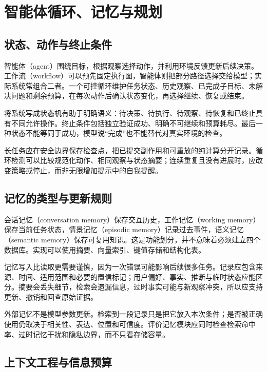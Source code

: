 \setcounter{chapter}{16} %
\chapter{智能体循环、记忆与规划}
\label{ch:agents}

\section{状态、动作与终止条件}

智能体（agent）围绕目标，根据观察选择动作，并利用环境反馈更新后续决策。工作流（workflow）可以预先固定执行图，智能体则把部分路径选择交给模型；实际系统常组合二者。一个可控循环维护任务状态、历史观察、已完成子目标、未解决问题和剩余预算，在每次动作后确认状态变化，再选择继续、恢复或结束。

将系统写成状态机有助于明确语义：待决策、待执行、待观察、待恢复和已终止具有不同允许操作。终止条件包括独立验证成功、明确不可继续和预算耗尽。最后一种状态不能等同于成功，模型说“完成”也不能替代对真实环境的检查。

长任务应在安全边界保存检查点，把已提交副作用和可重放的纯计算分开记录。循环检测可以比较规范化动作、相同观察与状态摘要；连续重复且没有进展时，应改变策略或停止，而非无限增加提示中的自我提醒。

\section{记忆的类型与更新规则}

会话记忆（conversation memory）保存交互历史，工作记忆（working memory）保存当前任务状态，情景记忆（episodic memory）记录过去事件，语义记忆（semantic memory）保存可复用知识。这是功能划分，并不意味着必须建立四个数据库。实现可以使用摘要、向量索引、键值存储和结构化表。

记忆写入比读取更需要谨慎，因为一次错误可能影响后续很多任务。记录应包含来源、时间、适用范围和必要的置信标记；用户偏好、事实、推断与临时状态应能区分。摘要会丢失细节，检索会遗漏信息，过时事实可能与新观察冲突，所以应支持更新、撤销和回查原始证据。

外部记忆不是模型参数更新。检索到一段记录只是把它放入本次条件；是否被正确使用仍取决于相关性、表达、位置和可信度。评价记忆模块应同时检查检索命中率、过时记忆干扰和隐私边界，而不只看存储容量。

\section{上下文工程与信息预算}

